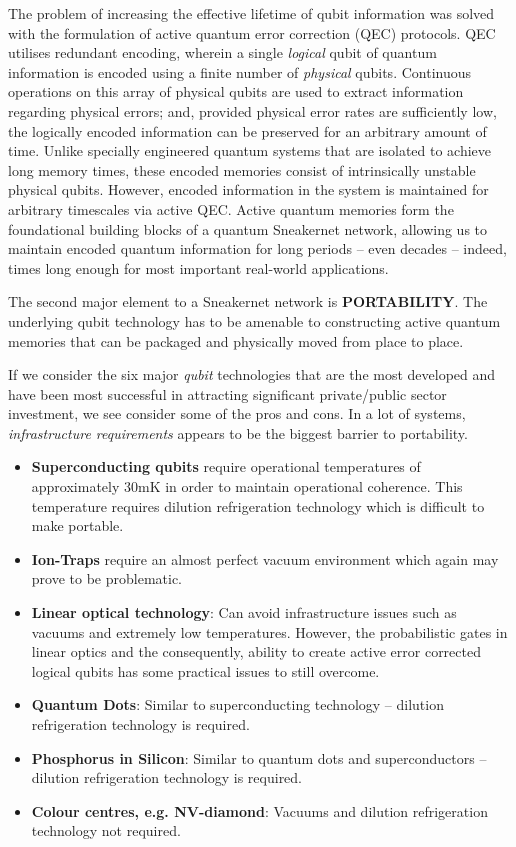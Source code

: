 \documentclass[twocolumn, aps, rmp, amsmath, amssymb, nofootinbib, superscriptaddress, longbibliography, floatfix, table-of-contents, eqsecnum]{revtex4-2}
\begin{document}
The problem of increasing the effective lifetime of qubit information was solved with the formulation of active quantum error correction (QEC) protocols. QEC utilises redundant encoding, wherein a single \textit{logical} qubit of quantum information is encoded using a finite number of \textit{physical} qubits. Continuous operations on this array of physical qubits are used to extract information regarding physical errors; and, provided physical error rates are sufficiently low, the logically encoded information can be preserved for an arbitrary amount of time. Unlike specially engineered quantum systems that are isolated to achieve long memory times, these encoded memories consist of intrinsically unstable physical qubits. However, encoded information in the system is maintained for arbitrary timescales via active QEC. Active quantum memories form the foundational building blocks of a quantum Sneakernet network, allowing us to maintain encoded quantum information for long periods -- even decades -- indeed, times long enough for most important real-world applications. 

The second major element to a Sneakernet network is \textbf{PORTABILITY}. The underlying qubit technology has to be amenable to constructing active quantum memories that can be packaged and physically moved from place to place. 

If we consider the six major \textit{qubit} technologies that are the most developed and have been most successful in attracting significant private/public sector investment, we see consider some of the pros and cons. In a lot of systems, \textit{infrastructure requirements} appears to be the biggest barrier to portability. 
\begin{itemize}
\item \textbf{Superconducting qubits} require operational temperatures of approximately 30mK in order to maintain operational coherence. This temperature requires dilution refrigeration technology which is difficult to make portable. 
\item \textbf{Ion-Traps} require an almost perfect vacuum environment which again may prove to be problematic. 
\item \textbf{Linear optical technology}: Can avoid infrastructure issues such as vacuums and extremely low temperatures. However, the probabilistic gates in linear optics and the consequently, ability to create active error corrected logical qubits has some practical issues to still overcome.  
\item \textbf{Quantum Dots}: Similar to superconducting technology -- dilution refrigeration technology is required.
\item \textbf{Phosphorus in Silicon}: Similar to quantum dots and superconductors -- dilution refrigeration technology is required. 
\item \textbf{Colour centres, e.g. NV-diamond}: Vacuums and dilution refrigeration technology not required. 
\end{itemize}
\end{document}
